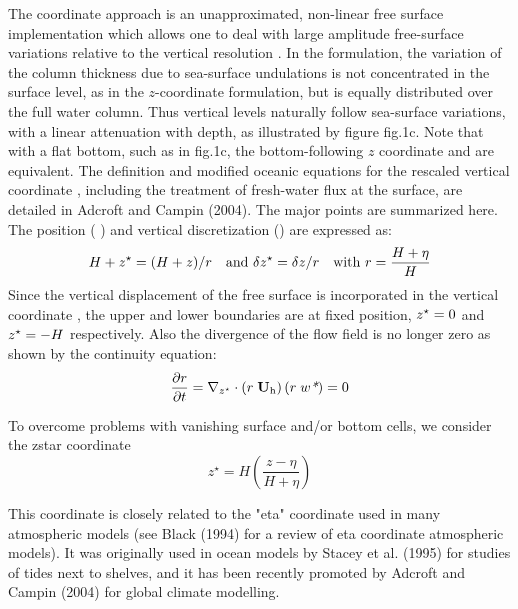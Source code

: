 \documentclass[../main/NEMO_manual]{subfiles}
\begin{document}
The \zstar coordinate approach is an unapproximated, non-linear free surface implementation which allows one to
deal with large amplitude free-surface variations relative to the vertical resolution \citep{Adcroft_Campin_OM04}.
In the \zstar formulation,
the variation of the column thickness due to sea-surface undulations is not concentrated in the surface level,
as in the $z$-coordinate formulation, but is equally distributed over the full water column.
Thus vertical levels naturally follow sea-surface variations, with a linear attenuation with depth,
as illustrated by figure fig.1c.
Note that with a flat bottom, such as in fig.1c, the bottom-following $z$ coordinate and \zstar are equivalent.
The definition and modified oceanic equations for the rescaled vertical coordinate  \zstar,
including the treatment of fresh-water flux at the surface, are detailed in Adcroft and Campin (2004).
The major points are summarized here.
The position ( \zstar) and vertical discretization (\zstar) are expressed as:
\[
  H +  z^\star = (H + z) / r \quad \text{and} \ \delta z^\star = \delta z / r \quad \text{with} \ r = \frac{H+\eta} {H}
\] 
Since the vertical displacement of the free surface is incorporated in the vertical coordinate \zstar,
the upper and lower boundaries are at fixed  \zstar position,
$z^\star = 0$ and  $z^\star = -H$ respectively.
Also the divergence of the flow field is no longer zero as shown by the continuity equation:
\[ 
  \frac{\partial r}{\partial t} = \nabla_{z^\star} \cdot \left( r \; \rm{\bf U}_h \right)
  \left( r \; w\textit{*} \right) = 0 
\] 



To overcome problems with vanishing surface and/or bottom cells, we consider the zstar coordinate 
\[
  z^\star = H \left( \frac{z-\eta}{H+\eta} \right)
\]

This coordinate is closely related to the "eta" coordinate used in many atmospheric models
(see Black (1994) for a review of eta coordinate atmospheric models).
It was originally used in ocean models by Stacey et al. (1995) for studies of tides next to shelves,
and it has been recently promoted by Adcroft and Campin (2004) for global climate modelling.
\end{document}
